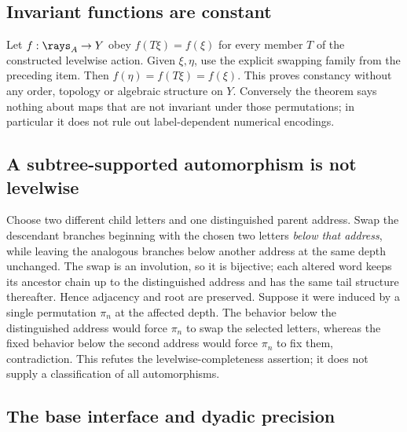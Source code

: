 \subsection{Invariant functions are constant}\label{supp:11-3}
\par{}\par\smallskip

Let $f:\rays_A\to Y$ obey $f(T\xi)=f(\xi)$ for every member $T$ of the constructed levelwise action. Given $\xi,\eta$, use the explicit swapping family from the preceding item. Then $f(\eta)=f(T\xi)=f(\xi)$. This proves constancy without any order, topology or algebraic structure on $Y$. Conversely the theorem says nothing about maps that are not invariant under those permutations; in particular it does not rule out label-dependent numerical encodings.

\subsection{A subtree-supported automorphism is not levelwise}\label{supp:11-4}
\par{}\par\smallskip

Choose two different child letters and one distinguished parent address. Swap the descendant branches beginning with the chosen two letters \emph{below that address}, while leaving the analogous branches below another address at the same depth unchanged. The swap is an involution, so it is bijective; each altered word keeps its ancestor chain up to the distinguished address and has the same tail structure thereafter. Hence adjacency and root are preserved. Suppose it were induced by a single permutation $\pi_n$ at the affected depth. The behavior below the distinguished address would force $\pi_n$ to swap the selected letters, whereas the fixed behavior below the second address would force $\pi_n$ to fix them, contradiction. This refutes the levelwise-completeness assertion; it does not supply a classification of all automorphisms.

\subsection{The base interface and dyadic precision}\label{supp:12-1}
\par{}\par\smallskip

